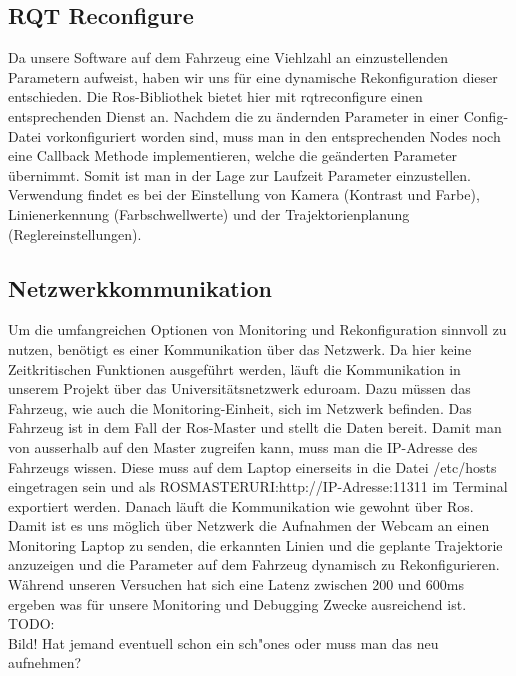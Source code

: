 \subsection{RQT Reconfigure}
Da unsere Software auf dem Fahrzeug eine Viehlzahl an einzustellenden Parametern aufweist, haben wir uns f\"ur eine dynamische Rekonfiguration dieser entschieden. Die Ros-Bibliothek bietet hier mit rqt\textunderscore reconfigure einen entsprechenden Dienst an. Nachdem die zu \"andernden Parameter in einer Config-Datei vorkonfiguriert worden sind, muss man in den entsprechenden Nodes noch eine Callback Methode implementieren, welche die ge\"anderten Parameter \"ubernimmt. Somit ist man in der Lage zur Laufzeit Parameter einzustellen. Verwendung findet es bei der Einstellung von Kamera (Kontrast und Farbe), Linienerkennung (Farbschwellwerte) und der Trajektorienplanung (Reglereinstellungen).

\subsection{Netzwerkkommunikation}
Um die umfangreichen Optionen von Monitoring und Rekonfiguration sinnvoll zu nutzen, ben\"otigt es einer Kommunikation \"uber das Netzwerk. Da hier keine Zeitkritischen Funktionen ausgef\"uhrt werden, l\"auft die Kommunikation in unserem Projekt \"uber das Universit\"atsnetzwerk eduroam. Dazu m\"ussen das Fahrzeug, wie auch die Monitoring-Einheit, sich im Netzwerk befinden. Das Fahrzeug ist in dem Fall der Ros-Master und stellt die Daten bereit. Damit man von ausserhalb auf den Master zugreifen kann, muss man die IP-Adresse des Fahrzeugs wissen. Diese muss auf dem Laptop einerseits in die Datei /etc/hosts eingetragen sein und als ROS\textunderscore MASTER\textunderscore URI:http://IP-Adresse:11311 im Terminal exportiert werden. Danach l\"auft die Kommunikation wie gewohnt \"uber Ros. Damit ist es uns m\"oglich \"uber Netzwerk die Aufnahmen der Webcam an einen Monitoring Laptop zu senden, die erkannten Linien und die geplante Trajektorie anzuzeigen und die Parameter auf dem Fahrzeug dynamisch zu Rekonfigurieren. W\"ahrend unseren Versuchen hat sich eine Latenz zwischen 200 und 600ms ergeben was f\"ur unsere Monitoring und Debugging Zwecke ausreichend ist. \\

TODO:\\
Bild! Hat jemand eventuell schon ein sch"ones oder muss man das neu aufnehmen?